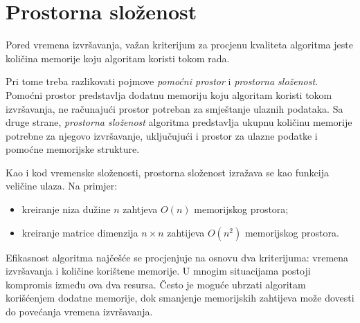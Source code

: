 \section{Prostorna složenost}

Pored vremena izvršavanja, važan kriterijum za procjenu kvaliteta algoritma jeste količina memorije koju algoritam koristi tokom rada.

Pri tome treba razlikovati pojmove \textit{pomoćni prostor} i \textit{prostorna složenost}. Pomoćni prostor predstavlja dodatnu memoriju koju algoritam koristi tokom izvršavanja, ne računajući prostor potreban za smještanje ulaznih podataka.  Sa druge strane, \textit{prostorna složenost} algoritma predstavlja ukupnu količinu memorije potrebne za njegovo izvršavanje, uključujući i prostor za ulazne podatke i pomoćne memorijske strukture.

Kao i kod vremenske složenosti, prostorna složenost izražava se kao funkcija veličine ulaza.  Na primjer:

\begin{itemize}
	\item kreiranje niza dužine $n$ zahtjeva $O(n)$ memorijskog prostora;
	\item kreiranje matrice dimenzija $n \times n$ zahtijeva $O(n^2)$ memorijskog prostora.
\end{itemize}

Efikasnost algoritma najčešće se procjenjuje na osnovu dva kriterijuma: vremena izvršavanja i količine korištene memorije. U mnogim situacijama postoji kompromis između ova dva resursa. Često je moguće ubrzati algoritam korišćenjem dodatne memorije, dok smanjenje memorijskih zahtijeva može dovesti do povećanja vremena izvršavanja.


